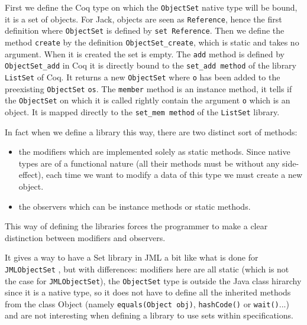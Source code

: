 First we define the Coq type on which the {\tt ObjectSet} native type will be bound,
it is a set of objects. For Jack, objects are seen as {\tt Reference}, hence the first definition
where {\tt ObjectSet} is defined by {\tt set Reference}.
Then we define the method {\tt create} by the definition {\tt ObjectSet\_create}, 
which is static and takes no argument. When it is created the set is empty.
The {\tt add} method is defined by {\tt ObjectSet\_add} in Coq it is directly bound to the 
{\tt set\_add method} of the library {\tt ListSet} of Coq. It returns a new {\tt ObjectSet} where 
{\tt o} has been added to
the preexisting {\tt ObjectSet} {\tt os}.
The {\tt member} method is an instance method, it tells if the {\tt ObjectSet} 
on which it is called rightly
contain the argument {\tt o} which is an object. It is mapped directly to the 
{\tt set\_mem method} of the {\tt ListSet} library.


In fact when we define a library this way, there are two distinct sort of methods:
\begin{itemize}
\item the modifiers which are implemented solely as static methods. 
Since native types are of a functional nature (all their methods must be without any side-effect), 
each time we want to modify a data of this type we must create a new object.
\item the observers which can be instance methods or static methods.
\end{itemize}
This way of defining the libraries forces the programmer to make a clear distinction 
between modifiers and observers.

   
 It gives a way to have a Set library in JML a bit like what is done for {\tt JMLObjectSet}
\cite{LPCCR-03-JML}, but with differences: modifiers here are all static
(which is not the case for  {\tt JMLObjectSet}),
 the {\tt ObjectSet} type is outside the Java class hirarchy since it is a native type,
so it does not have 
to define all the inherited methods from the class Object 
(namely {\tt equals(Object obj)}, {\tt hashCode()} or 
{\tt wait()}...) and are not interesting when defining a library to use sets within specifications.